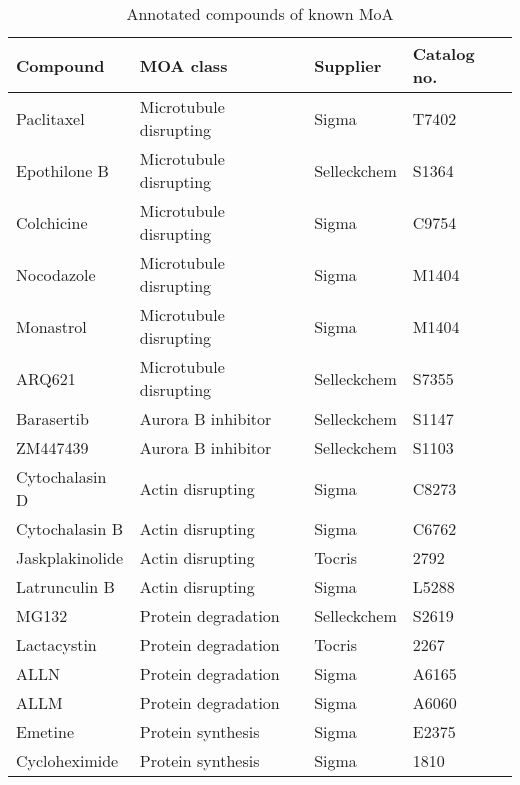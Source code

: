 \documentclass[a4paper,11pt,twoside,openright]{scrbook}
\begin{document}
\begin{table}[]
    \begin{footnotesize}
    \centering
    \caption[Annotated compounds of known MoA]{Annotated compounds of known MoA}
    \label{table:compounds}
    \begin{tabular}{@{}llll@{}}
    \toprule
    Compound        & MOA class              & Supplier    & Catalog no. \\ \midrule
    Paclitaxel      & Microtubule disrupting & Sigma       & T7402       \\
    Epothilone B    & Microtubule disrupting & Selleckchem & S1364       \\
    Colchicine      & Microtubule disrupting & Sigma       & C9754       \\
    Nocodazole      & Microtubule disrupting & Sigma       & M1404       \\
    Monastrol       & Microtubule disrupting & Sigma       & M1404       \\
    ARQ621          & Microtubule disrupting & Selleckchem & S7355       \\
    Barasertib      & Aurora B inhibitor     & Selleckchem & S1147       \\
    ZM447439        & Aurora B inhibitor     & Selleckchem & S1103       \\
    Cytochalasin D  & Actin disrupting       & Sigma       & C8273       \\
    Cytochalasin B  & Actin disrupting       & Sigma       & C6762       \\
    Jaskplakinolide & Actin disrupting       & Tocris      & 2792        \\
    Latrunculin B   & Actin disrupting       & Sigma       & L5288       \\
    MG132           & Protein degradation    & Selleckchem & S2619       \\
    Lactacystin     & Protein degradation    & Tocris      & 2267        \\
    ALLN            & Protein degradation    & Sigma       & A6165       \\
    ALLM            & Protein degradation    & Sigma       & A6060       \\
    Emetine         & Protein synthesis      & Sigma       & E2375       \\
    Cycloheximide   & Protein synthesis      & Sigma       & 1810        \\

\end{tabular}
\end{footnotesize}
\end{table}
\end{document}
